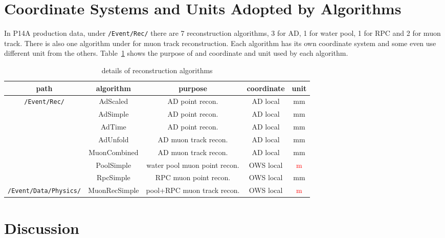 \documentclass[letterpaper, 11pt]{scrartcl} %
\numberwithin{equation}{section} %
\numberwithin{figure}{section} %
\numberwithin{table}{section} %
\begin{document}

\section{Coordinate Systems and Units Adopted by Algorithms}

In P14A production data, under \texttt{\footnotesize{/Event/Rec/}} there are 7 reconstruction algorithms, 3 for AD, 1 for water pool, 1 for RPC and 2 for muon track. There is also one algorithm under \texttt{\footnotesize{}} for muon track reconstruction. Each algorithm has its own coordinate system and some even use different unit from the others. Table~\ref{table:algdetail} shows the purpose of and coordinate and unit used by each algorithm.
\begin{table}
	\small
	\centering
	\begin{tabular}{|c|c|c|c|c|}
		\hline
		path & algorithm & purpose & coordinate & unit \\
		\hline
		\multirow{7}{*}{\texttt{\scriptsize{/Event/Rec/}}} & AdScaled & AD point recon. & AD local & mm \\
		\cline{2-5}
		& AdSimple & AD point recon. & AD local & mm \\
		\cline{2-5}
		& AdTime   & AD point recon. & AD local & mm \\
		\cline{2-5}
		& AdUnfold & AD muon track recon. & AD local & mm \\
		\cline{2-5}
		& MuonCombined & AD muon track recon. & AD local & mm \\
		\cline{2-5}
		& PoolSimple & water pool muon point recon. & OWS local & \textcolor{red}{m} \\
		\cline{2-5}
		& RpcSimple & RPC muon point recon. & OWS local & mm \\
		\hline
		\texttt{\scriptsize{/Event/Data/Physics/}} & MuonRecSimple & pool+RPC muon track recon. & OWS local & \textcolor{red}{m} \\
		\hline
	\end{tabular}
	\caption{details of reconstruction algorithms}
	\label{table:algdetail}
\end{table}


\section{Discussion}
\end{document}
